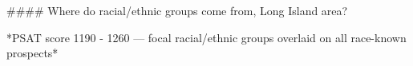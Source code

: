 #### Where do racial/ethnic groups come from, Long Island area?

*PSAT score 1190 - 1260 — focal racial/ethnic groups overlaid on all race-known prospects*
